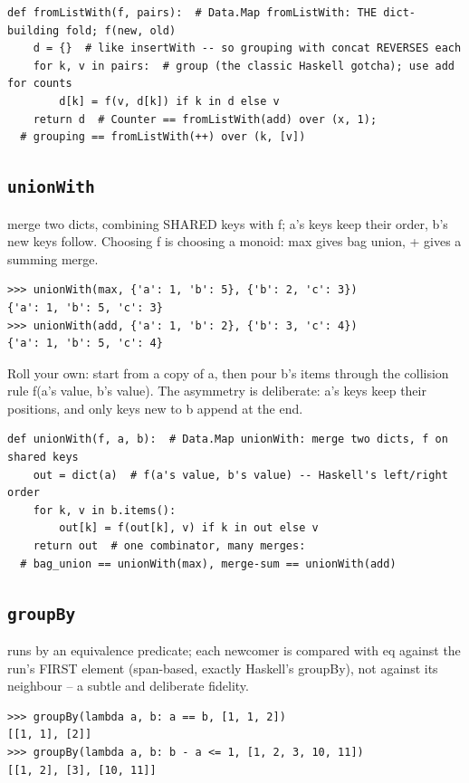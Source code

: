 \documentclass[10pt,letterpaper]{book}
\begin{document}
\begin{lstlisting}[style=ex]
def fromListWith(f, pairs):  # Data.Map fromListWith: THE dict-building fold; f(new, old)
    d = {}  # like insertWith -- so grouping with concat REVERSES each
    for k, v in pairs:  # group (the classic Haskell gotcha); use add for counts
        d[k] = f(v, d[k]) if k in d else v
    return d  # Counter == fromListWith(add) over (x, 1);
  # grouping == fromListWith(++) over (k, [v])
\end{lstlisting}

\subsection{\texttt{unionWith}}\label{def:unionWith}
merge two dicts, combining SHARED keys with f; a's keys keep their order, b's new keys follow. Choosing f is choosing a monoid: max gives bag union, + gives a summing merge.
\begin{lstlisting}[style=ex]
>>> unionWith(max, {'a': 1, 'b': 5}, {'b': 2, 'c': 3})
{'a': 1, 'b': 5, 'c': 3}
>>> unionWith(add, {'a': 1, 'b': 2}, {'b': 3, 'c': 4})
{'a': 1, 'b': 5, 'c': 4}
\end{lstlisting}

Roll your own: start from a copy of a, then pour b's items through the collision rule f(a's value, b's value). The asymmetry is deliberate: a's keys keep their positions, and only keys new to b append at the end.

\begin{lstlisting}[style=ex]
def unionWith(f, a, b):  # Data.Map unionWith: merge two dicts, f on shared keys
    out = dict(a)  # f(a's value, b's value) -- Haskell's left/right order
    for k, v in b.items():
        out[k] = f(out[k], v) if k in out else v
    return out  # one combinator, many merges:
  # bag_union == unionWith(max), merge-sum == unionWith(add)
\end{lstlisting}

\subsection{\texttt{groupBy}}\label{def:groupBy}
runs by an equivalence predicate; each newcomer is compared with eq against the run's FIRST element (span-based, exactly Haskell's groupBy), not against its neighbour -- a subtle and deliberate fidelity.
\begin{lstlisting}[style=ex]
>>> groupBy(lambda a, b: a == b, [1, 1, 2])
[[1, 1], [2]]
>>> groupBy(lambda a, b: b - a <= 1, [1, 2, 3, 10, 11])
[[1, 2], [3], [10, 11]]
\end{lstlisting}
\end{document}
